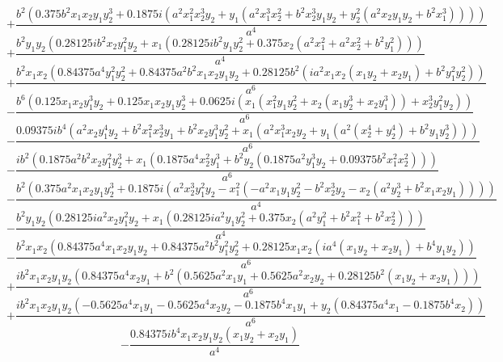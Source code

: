 $$+\frac{b^{2} \left(0.375 b^{2} x_{1} x_{2} y_{1} y_{2}^{3} + 0.1875 i \left(a^{2} x_{1}^{2} x_{2}^{3} y_{2} + y_{1} \left(a^{2} x_{1}^{3} x_{2}^{2} + b^{2} x_{2}^{3} y_{1} y_{2} + y_{2}^{2} \left(a^{2} x_{2} y_{1} y_{2} + b^{2} x_{1}^{3}\right)\right)\right)\right)}{a^{4}}$$
$$+\frac{b^{2} y_{1} y_{2} \left(0.28125 i b^{2} x_{2} y_{1}^{2} y_{2} + x_{1} \left(0.28125 i b^{2} y_{1} y_{2}^{2} + 0.375 x_{2} \left(a^{2} x_{1}^{2} + a^{2} x_{2}^{2} + b^{2} y_{1}^{2}\right)\right)\right)}{a^{4}}$$
$$+\frac{b^{2} x_{1} x_{2} \left(0.84375 a^{4} y_{1}^{2} y_{2}^{2} + 0.84375 a^{2} b^{2} x_{1} x_{2} y_{1} y_{2} + 0.28125 b^{2} \left(i a^{2} x_{1} x_{2} \left(x_{1} y_{2} + x_{2} y_{1}\right) + b^{2} y_{1}^{2} y_{2}^{2}\right)\right)}{a^{6}}$$
$$- \frac{b^{6} \left(0.125 x_{1} x_{2} y_{1}^{3} y_{2} + 0.125 x_{1} x_{2} y_{1} y_{2}^{3} + 0.0625 i \left(x_{1} \left(x_{1}^{2} y_{1} y_{2}^{2} + x_{2} \left(x_{1} y_{2}^{3} + x_{2} y_{1}^{3}\right)\right) + x_{2}^{3} y_{1}^{2} y_{2}\right)\right)}{a^{6}}$$
$$- \frac{0.09375 i b^{4} \left(a^{2} x_{2} y_{1}^{4} y_{2} + b^{2} x_{1}^{2} x_{2}^{3} y_{1} + b^{2} x_{2} y_{1}^{3} y_{2}^{2} + x_{1} \left(a^{2} x_{1}^{3} x_{2} y_{2} + y_{1} \left(a^{2} \left(x_{2}^{4} + y_{2}^{4}\right) + b^{2} y_{1} y_{2}^{3}\right)\right)\right)}{a^{6}}$$
$$- \frac{i b^{2} \left(0.1875 a^{2} b^{2} x_{2} y_{1}^{2} y_{2}^{3} + x_{1} \left(0.1875 a^{4} x_{2}^{2} y_{1}^{3} + b^{2} y_{2} \left(0.1875 a^{2} y_{1}^{3} y_{2} + 0.09375 b^{2} x_{1}^{2} x_{2}^{2}\right)\right)\right)}{a^{6}}$$
$$- \frac{b^{2} \left(0.375 a^{2} x_{1} x_{2} y_{1} y_{2}^{3} + 0.1875 i \left(a^{2} x_{2}^{3} y_{1}^{2} y_{2} - x_{1}^{2} \left(- a^{2} x_{1} y_{1} y_{2}^{2} - b^{2} x_{2}^{3} y_{2} - x_{2} \left(a^{2} y_{2}^{3} + b^{2} x_{1} x_{2} y_{1}\right)\right)\right)\right)}{a^{4}}$$
$$- \frac{b^{2} y_{1} y_{2} \left(0.28125 i a^{2} x_{2} y_{1}^{2} y_{2} + x_{1} \left(0.28125 i a^{2} y_{1} y_{2}^{2} + 0.375 x_{2} \left(a^{2} y_{1}^{2} + b^{2} x_{1}^{2} + b^{2} x_{2}^{2}\right)\right)\right)}{a^{4}}$$
$$- \frac{b^{2} x_{1} x_{2} \left(0.84375 a^{4} x_{1} x_{2} y_{1} y_{2} + 0.84375 a^{2} b^{2} y_{1}^{2} y_{2}^{2} + 0.28125 x_{1} x_{2} \left(i a^{4} \left(x_{1} y_{2} + x_{2} y_{1}\right) + b^{4} y_{1} y_{2}\right)\right)}{a^{6}}$$
$$+\frac{i b^{2} x_{1} x_{2} y_{1} y_{2} \left(0.84375 a^{4} x_{2} y_{1} + b^{2} \left(0.5625 a^{2} x_{1} y_{1} + 0.5625 a^{2} x_{2} y_{2} + 0.28125 b^{2} \left(x_{1} y_{2} + x_{2} y_{1}\right)\right)\right)}{a^{6}}$$
$$+\frac{i b^{2} x_{1} x_{2} y_{1} y_{2} \left(- 0.5625 a^{4} x_{1} y_{1} - 0.5625 a^{4} x_{2} y_{2} - 0.1875 b^{4} x_{1} y_{1} + y_{2} \left(0.84375 a^{4} x_{1} - 0.1875 b^{4} x_{2}\right)\right)}{a^{6}}$$
$$- \frac{0.84375 i b^{4} x_{1} x_{2} y_{1} y_{2} \left(x_{1} y_{2} + x_{2} y_{1}\right)}{a^{4}}$$
